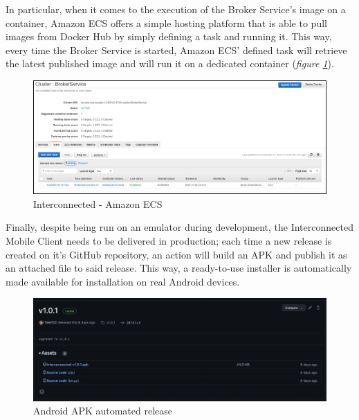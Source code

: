 In particular, when it comes to the execution of the Broker Service's image on a container, Amazon ECS offers a simple hosting platform that is able to pull images from Docker Hub by simply defining a task and running it. This way, every time the Broker Service is started, Amazon ECS' defined task will retrieve the latest published image and will run it on a dedicated container (\textit{figure \ref{fig:interconnected_ecs}}).

\begin{figure}[!ht]
    \centering
    \includegraphics[width=\linewidth]{document/chapters/chapter_7/images/interconnected_ecs.png}
    \caption{Interconnected - Amazon ECS}
    \label{fig:interconnected_ecs}
\end{figure}

Finally, despite being run on an emulator during development, the Interconnected Mobile Client needs to be delivered in production; each time a new release is created on it's GitHub repository, an action will build an APK and publish it as an attached file to said release. This way, a ready-to-use installer is automatically made available for installation on real Android devices.

\begin{figure}[!ht]
    \centering
    \includegraphics[scale=0.35]{document/chapters/chapter_7/images/github_actions_apk.png}
    \caption{Android APK automated release}
    \label{fig:github_actions_apk}
\end{figure}